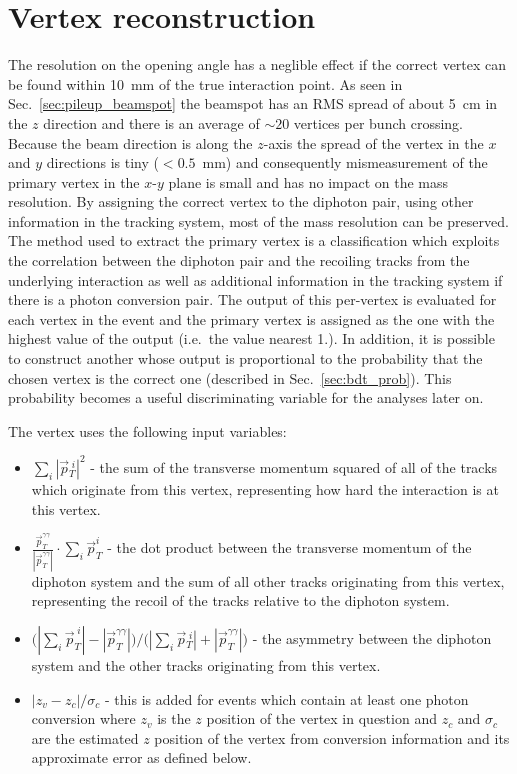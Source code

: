 \section{Vertex reconstruction}
\label{sec:vtx_reco}

The resolution on the opening angle has a neglible effect if the correct vertex can be found within 10~mm of the true interaction point. As seen in Sec.~\ref{sec:pileup_beamspot} the beamspot has an RMS spread of about 5~cm in the $z$ direction and there is an average of $\sim20$ vertices per bunch crossing. Because the beam direction is along the $z$-axis the spread of the vertex in the $x$ and $y$ directions is tiny ($<0.5$~mm) and consequently mismeasurement of the primary vertex in the $x$-$y$ plane is small and has no impact on the mass resolution. By assigning the correct vertex to the diphoton pair, using other information in the tracking system, most of the mass resolution can be preserved. The method used to extract the primary vertex is a classification \BDT which exploits the correlation between the diphoton pair and the recoiling tracks from the underlying interaction as well as additional information in the tracking system if there is a photon conversion pair. The output of this per-vertex \BDT is evaluated for each vertex in the event and the primary vertex is assigned as the one with the highest value of the \BDT output (i.e.\ the value nearest 1.). In addition, it is possible to construct another \BDT whose output is proportional to the probability that the chosen vertex is the correct one (described in Sec.~\ref{sec:bdt_prob}). This probability becomes a useful discriminating variable for the analyses later on.

The vertex \BDT uses the following input variables:

\begin{itemize}
  \item $\sum\limits_{i} |\vec{p}{}^{\;i}_{T}|^{2}$ - the sum of the transverse momentum squared of all of the tracks which originate from this vertex, representing how hard the interaction is at this vertex.
  \item $\frac{\vec{p}^{\gamma\gamma}_{T}}{|\vec{p}^{\gamma\gamma}_{T}|} \cdot \sum\limits_{i} \vec{p}_{T}^{i}$ - the dot product between the transverse momentum of the diphoton system and the sum of all other tracks originating from this vertex, representing the recoil of the tracks relative to the diphoton system.
  \item $\bigr(|\sum\limits_{i} \vec{p}^{\;i}_{T}| - |\vec{p}^{\gamma\gamma}_{T}|\bigl) / \bigr(|\sum\limits_{i} \vec{p}{}^{\;i}_{T}| + |\vec{p}^{\gamma\gamma}_{T}|\bigl)$ - the asymmetry between the diphoton system and the other tracks originating from this vertex.
  \item $|z_{v}-z_{c}|/\sigma_{c}$ - this is added for events which contain at least one photon conversion where $z_{v}$ is the $z$ position of the vertex in question and $z_{c}$ and $\sigma_{c}$ are the estimated $z$ position of the vertex from conversion information and its approximate error as defined below.
\end{itemize}

